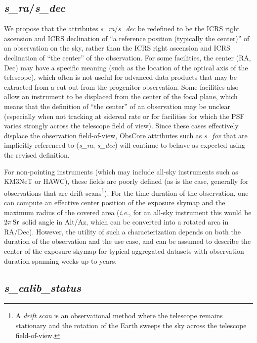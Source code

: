 \documentclass[11pt,a4paper]{ivoa}
\begin{document}
\subsection{{\em s\_ra\/}/{\em s\_dec}}

We propose that the attributes {\em s\_ra\/}/{\em s\_dec\/} be redefined to be the ICRS right ascension and ICRS declination of ``a reference position (typically the center)'' of an observation on the sky, rather than the ICRS right ascension and ICRS declination of ``the center'' of the observation.  For some facilities, the center (RA, Dec) may have a specific meaning (such as the location of the optical axis of the telescope), which often is not useful for advanced data products that may be extracted from a cut-out from the progenitor observation.  Some facilities also allow an instrument to be displaced from the center of the focal plane, which means that the definition of ``the center'' of an observation may be unclear (especially when not tracking at sidereal rate or for facilities for which the PSF varies strongly across the telescope field of view).  Since these cases effectively displace the observation field-of-view, ObsCore attributes such as {\em s\_fov\/} that are implicitly referenced to ({\em s\_ra\/}, {\em s\_dec\/}) will continue to behave as expected using the revised definition.

For non-pointing instruments (which may include all-sky instruments such as KM3NeT or HAWC), these fields are poorly defined (as is the case, generally for observations that are drift scans\footnote{A {\em drift scan\/} is an observational method where the telescope remains stationary and the rotation of the Earth sweeps the sky across the telescope field-of-view.}).  For the time duration of the observation, one can compute an effective center position of the exposure skymap and the maximum radius of the covered area ({\em i.e.\/}, for an all-sky instrument this would be $2\pi\,\rm Sr$ solid angle in Alt/Az, which can be converted into a rotated area in RA/Dec). However, the utility of such a characterization depends on both the duration of the observation and the use case, and can be assumed to describe the center of the exposure skymap for typical aggregated datasets with observation duration spanning weeks up to years.

\subsection{{\em s\_calib\_status}}
\end{document}
